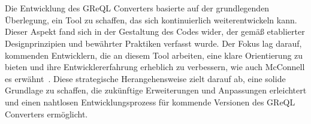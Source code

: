 \\~\\

Die Entwicklung des GReQL Converters basierte auf der grundlegenden Überlegung, ein Tool zu schaffen, das sich
kontinuierlich weiterentwickeln kann. Dieser Aspekt fand sich in der Gestaltung des Codes wider, der gemäß etablierter
Designprinzipien und bewährter Praktiken verfasst wurde. Der Fokus lag darauf, kommenden Entwicklern, die an diesem Tool
arbeiten, eine klare Orientierung zu bieten und ihre Entwicklererfahrung erheblich zu verbessern, wie auch McConnell es
erwähnt~\cite{mcconnell2006software}. Diese strategische Herangehensweise zielt darauf ab, eine solide Grundlage zu
schaffen, die zukünftige Erweiterungen und Anpassungen erleichtert und einen nahtlosen Entwicklungsprozess für kommende
Versionen des GReQL Converters ermöglicht.
